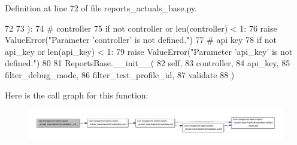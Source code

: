 Definition at line 72 of file reports\-\_\-actuals\-\_\-base.\-py.


\begin{DoxyCode}
72 
73     ):
74         \textcolor{comment}{# controller}
75         \textcolor{keywordflow}{if} \textcolor{keywordflow}{not} controller \textcolor{keywordflow}{or} len(controller) < 1:
76             \textcolor{keywordflow}{raise} ValueError(\textcolor{stringliteral}{"Parameter 'controller' is not defined."})
77         \textcolor{comment}{# api key}
78         \textcolor{keywordflow}{if} \textcolor{keywordflow}{not} api\_key \textcolor{keywordflow}{or} len(api\_key) < 1:
79             \textcolor{keywordflow}{raise} ValueError(\textcolor{stringliteral}{"Parameter 'api\_key' is not defined."})
80 
81         ReportsBase.\_\_init\_\_(
82             self,
83             controller,
84             api\_key,
85             filter\_debug\_mode,
86             filter\_test\_profile\_id,
87             validate
88         )

\end{DoxyCode}


Here is the call graph for this function\-:
\nopagebreak
\begin{figure}[H]
\begin{center}
\leavevmode
\includegraphics[width=350pt]{classtune_1_1management_1_1reports_1_1reports__actuals__base_1_1ReportsActualsBase_ad6dd33811e39b883d39844d3a895fdb9_cgraph}
\end{center}
\end{figure}




